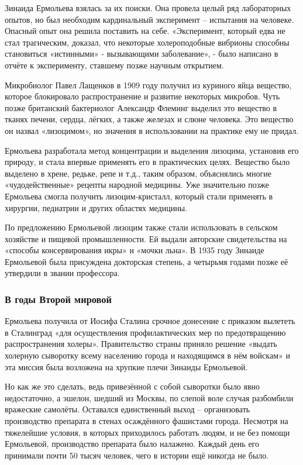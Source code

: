 Зинаида Ермольева взялась за их поиски. Она провела целый ряд лабораторных
опытов, но был необходим кардинальный эксперимент – испытания на человеке.
Опасный опыт она решила поставить на себе. «Эксперимент, который едва не стал
трагическим, доказал, что некоторые холероподобные вибрионы способны
становиться «истинными» - вызывающими заболевание», - было написано в отчёте к
эксперименту, ставшему позже научным открытием.

Микробиолог Павел Лащенков в 1909 году получил из куриного яйца вещество,
которое блокировало распространение и развитие некоторых микробов. Чуть позже
британский бактериолог Александр Флеминг выделил это вещество в тканях печени,
сердца, лёгких, а также железах и слюне человека. Это вещество он назвал
«лизоцимом», но значения в использовании на практике ему не придал.  

Ермольева разработала метод концентрации и выделения лизоцима, установив его
природу, и стала впервые применять его в практических целях. Вещество было
выделено в хрене, редьке, репе и т.д., таким образом, объяснялись многие
«чудодейственные» рецепты народной медицины. Уже значительно позже Ермольева
смогла получить лизоцим-кристалл, который стали применять в хирургии, педиатрии
и других областях медицины.

По предложению Ермольевой лизоцим также стали использовать в сельском хозяйстве
и пищевой промышленности. Ей выдали авторские свидетельства на «способы
консервирования икры» и «мочки льна». В 1935 году Зинаиде Ермольевой была
присуждена докторская степень, а четырьмя годами позже её утвердили в звании
профессора.

\subsubsection{В годы Второй мировой}

Ермольева получила от Иосифа Сталина срочное донесение с приказом вылететь в
Сталинград «для осуществления профилактических мер по предотвращению
распространения холеры». Правительство страны приняло решение «выдать холерную
сыворотку всему населению города и находящимся в нём войскам» и эта миссия была
возложена на хрупкие плечи Зинаиды Ермольевой.

Но как же это сделать, ведь привезённой с собой сыворотки было явно
недостаточно, а эшелон, шедший из Москвы, по слепой воле случая разбомбили
вражеские самолёты. Оставался единственный выход – организовать производство
препарата в стенах осаждённого фашистами города. Несмотря на тяжелейшие
условия, в которых приходилось работать людям, и не без помощи Ермольевой,
производство препарата было налажено. Каждый день его принимали почти 50 тысяч
человек, чего в истории ещё никогда не было.

